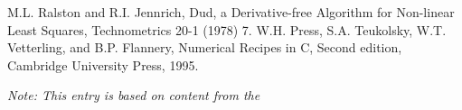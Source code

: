 \documentclass[12pt]{article}
\begin{document}
\begin{thebibliography}{9}
 M.L. Ralston and R.I. Jennrich, Dud, a Derivative-free Algorithm for Non-linear Least Squares, Technometrics 20-1 (1978) 7.
 W.H. Press, S.A. Teukolsky, W.T. Vetterling, and B.P. Flannery, Numerical Recipes in C, Second edition, Cambridge University Press, 1995.
\end{thebibliography}

{\it Note: This entry is based on content from the }
\end{document}
